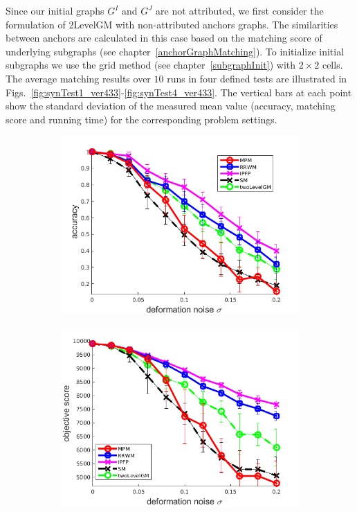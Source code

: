 Since our initial graphs $G^I$ and $G^J$ are not attributed, we first consider the formulation of 2LevelGM with non-attributed anchors graphs. The similarities between anchors are calculated in this case based on the matching score of underlying subgraphs (see chapter~\ref{anchorGraphMatching}). To initialize initial subgraphs we use the grid method (see chapter~\ref{subgraphInit}) with $2\times 2$ cells. The average matching results over $10$ runs in four defined tests are illustrated in Figs.~\ref{fig:synTest1_ver433}-\ref{fig:synTest4_ver433}. The vertical bars at each point show the standard deviation of the measured mean value (accuracy, matching score and running time) for the corresponding problem settings.
\begin{figure}
	\begin{subfigure}[b]{0.33\textwidth}
		\centering
		\includegraphics[scale=0.25]{"chapter3/fig/SyntheticTest/no_descr/Results_v4.3.3/Test2/accuracy_avg10t"} 
	\end{subfigure}
	\begin{subfigure}[b]{0.33\textwidth}
		\centering
		\includegraphics[scale=0.25]{"chapter3/fig/SyntheticTest/no_descr/Results_v4.3.3/Test2/score_avg10t"} 

\end{subfigure}
\end{figure}
